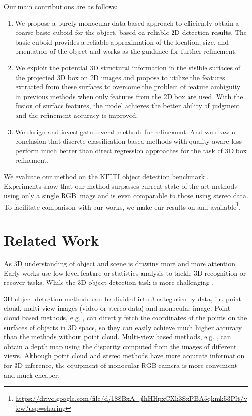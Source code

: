 \documentclass[10pt,twocolumn,letterpaper]{article}
\begin{document}
Our main contributions are as follows:
\begin{enumerate}
\item We propose a purely monocular data based approach to efficiently obtain a coarse basic cuboid for the object, based on reliable 2D detection results. The basic cuboid provides a reliable approximation of the location, size, and orientation of the object and works as the guidance for further refinement. 
\item We exploit the potential 3D structural information in the visible surfaces of the projected 3D box on 2D images and propose to utilize the features extracted from these surfaces to overcome the problem of feature ambiguity in previous methods when only features from the 2D box are used. With the fusion of surface features, the model achieves the better ability of judgment and the refinement accuracy is improved.
\item We design and investigate several methods for refinement. And we draw a conclusion that discrete classification based methods with quality aware loss perform much better than direct regression approaches for the task of 3D box refinement.
\end{enumerate}

We evaluate our method on the KITTI object detection benchmark \cite{kitti}. Experiments show that our method surpasses current state-of-the-art methods using only a single RGB image and is even comparable to those using stereo data. To facilitate comparison with our works, we make our results on  and  available\footnote{\url{https://drive.google.com/file/d/188BxA_jlhHHpxCXk3SxPBA5qkmk53PIt/view?usp=sharing}}.

\section{Related Work}

As 3D understanding of object and scene is drawing more and more attention. Early works \cite{aspect,3drecovery,zia2013detailed,hejrati2012analyzing,del2013understanding} use low-level feature or statistics analysis to tackle 3D recognition or recover tasks. While the 3D object detection task is more challenging \cite{kitti}.

3D object detection methods can be divided into 3 categories by data, i.e. point cloud, multi-view images (video or stereo data) and monocular image.
Point cloud based methods, e.g. \cite{mv3d,fpointnet,voxelnet,avod,shi2018pointrcnn}, can directly fetch the coordinates of the points on the surfaces of objects in 3D space, so they can easily achieve much higher accuracy than the methods without point cloud. Multi-view based methods, e.g. \cite{3dop}, can obtain a depth map using the disparity computed from the images of different views. Although point cloud and stereo methods have more accurate information for 3D inference, the equipment of monocular RGB camera is more convenient and much cheaper.
\end{document}
